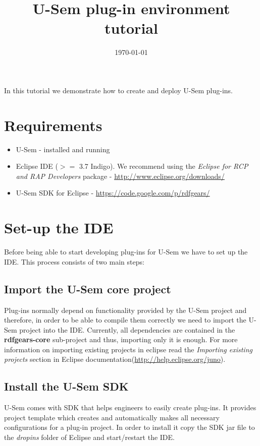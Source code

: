 \documentclass[a4paper, notitlepage]{article}
\begin{document}
\title{U-Sem plug-in environment tutorial} 
\date{\today}
\maketitle

In this tutorial we demonstrate how to create and deploy U-Sem plug-ins. 

\section{Requirements}

\begin{itemize}
	\item U-Sem - installed and running
	\item Eclipse IDE ($>=$ 3.7 Indigo). We recommend using the \textit{Eclipse for RCP and RAP Developers} package - \url{http://www.eclipse.org/downloads/}
	\item U-Sem SDK for Eclipse - \url{https://code.google.com/p/rdfgears/}
\end{itemize}

\section{Set-up the IDE}

Before being able to start developing plug-ins for U-Sem we have to set up the IDE. This process consists of two main steps:

\subsection{Import the U-Sem core project}

Plug-ins normally depend on functionality provided by the U-Sem project and therefore, in order to be able to compile them correctly we need to import the U-Sem project into the IDE. Currently, all dependencies are contained in the \textbf{rdfgears-core} sub-project and thus, importing only it is enough. For more information on importing existing projects in eclipse read the \textit{Importing existing projects} section in Eclipse documentation(\url{http://help.eclipse.org/juno}).

\subsection{Install the U-Sem SDK}
U-Sem comes with SDK that helps engineers to easily create plug-ins. It provides project template which creates and automatically makes all necessary configurations for a plug-in project. In order to install it copy the SDK jar file to the \textit{dropins} folder of Eclipse and start/restart the IDE. 
\end{document}
